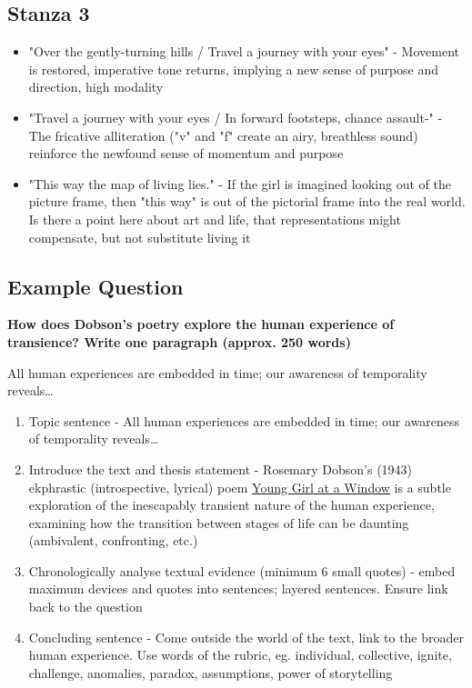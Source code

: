 \subsection{Stanza 3}
	\begin{itemize}
		\item "Over the gently-turning hills / Travel a journey with your eyes" - Movement is restored, imperative tone returns, implying a new sense of purpose and direction, high modality
		\item "Travel a journey with your eyes / In forward footsteps, chance assault-" - The fricative alliteration ("v" and "f" create an airy, breathless sound) reinforce the newfound sense of momentum and purpose
		\item "This way the map of living lies." - If the girl is imagined looking out of the picture frame, then "this way" is out of the pictorial frame into the real world. Is there a point here about art and life, that representations might compensate, but not substitute living it
	\end{itemize}

\subsection{Example Question}
	\textbf{How does Dobson's poetry explore the human experience of transience? Write one paragraph (approx. 250 words)}

	All human experiences are embedded in time; our awareness of temporality reveals\dots
	\begin{enumerate}
		\item Topic sentence - All human experiences are embedded in time; our awareness of temporality reveals\dots
		\item Introduce the text and thesis statement - Rosemary Dobson's (1943) ekphrastic (introspective, lyrical) poem \underline{Young Girl at a Window} is a subtle exploration of the inescapably transient nature of the human experience, examining how the transition between stages of life can be daunting (ambivalent, confronting, etc.)
		\item Chronologically analyse textual evidence (minimum 6 small quotes) - embed maximum devices and quotes into sentences; layered sentences. Ensure link back to the question
		\item Concluding sentence - Come outside the world of the text, link to the broader human experience. Use words of the rubric, eg. individual, collective, ignite, challenge, anomalies, paradox, assumptions, power of storytelling
	\end{enumerate}
